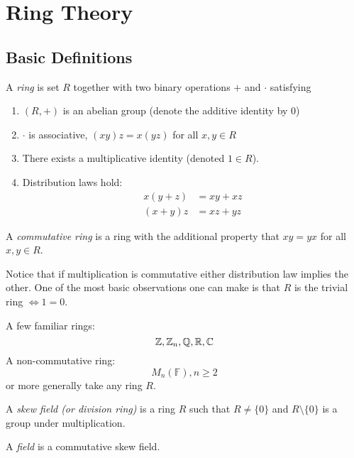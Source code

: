 \documentclass[master.tex]{subfiles}
\begin{document}
\section{Ring Theory}
\subsection{Basic Definitions}
\newcommand{\F}{\mathbb{F}} \newtheorem*{notation}{Notation}

\begin{defn*}
  A \emph{ring} is set \(R\) together with two binary operations \(+\) and \(\cdot\) satisfying
  \begin{enumerate}[label=(\roman*)]
  \item \((R,+)\) is an abelian group (denote the additive identity by \(0\))
  \item \(\cdot\) is associative, \((xy)z=x(yz)\) for all \(x,y \in R\)
  \item There exists a multiplicative identity (denoted \(1 \in R\)).
  \item Distribution laws hold:
    \begin{align*}
      x(y+z) &= xy + xz\\
      (x+y)z &= xz+yz
    \end{align*}
  \end{enumerate}
\end{defn*}

\begin{defn*}
  A \emph{commutative ring} is a ring with the additional property that \(xy=yx\) for all \(x,y \in R\).
\end{defn*}
Notice that if multiplication is commutative either distribution law implies the other. One of the most basic
observations one can make is that \(R\) is the trivial ring \(\iff 1=0\). 

\begin{example*}
  A few familiar rings: \[{\mathbb Z},{\mathbb Z}_n,{\mathbb Q},{\mathbb R},{\mathbb C}\] A non-commutative ring:
  \[M_n(\F), n \ge 2\] or more generally take any ring \(R\).
\end{example*}

\begin{defn*}
  A \emph{skew field (or division ring)} is a ring \(R\) such that \(R \neq \{0\}\) and \(R \setminus \{0\}\) is a group
  under multiplication.
\end{defn*}

\begin{defn*}
  A \emph{field} is a commutative skew field.
\end{defn*}
\end{document}

